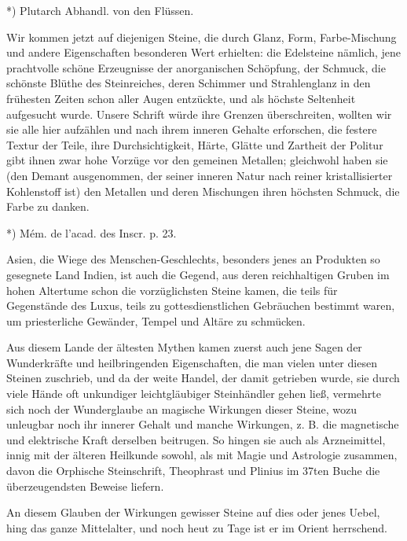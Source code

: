 \documentclass[a4paper, 11pt, oneside, polutonikogreek, german]{article}
\begin{document}
*) Plutarch Abhandl. von den Flüssen.

Wir kommen jetzt auf diejenigen Steine, die durch Glanz, Form, Farbe-Mischung und andere Eigenschaften besonderen Wert erhielten: die Edelsteine nämlich, jene prachtvolle schöne Erzeugnisse der anorganischen Schöpfung, der Schmuck, die schönste Blüthe des Steinreiches, deren Schimmer und Strahlenglanz in den frühesten Zeiten schon aller Augen entzückte, und als höchste Seltenheit aufgesucht wurde. Unsere Schrift würde ihre Grenzen überschreiten, wollten wir sie alle hier aufzählen und nach ihrem inneren Gehalte erforschen, die festere Textur der Teile, ihre Durchsichtigkeit, Härte, Glätte und Zartheit der Politur gibt ihnen zwar hohe Vorzüge vor den gemeinen Metallen; gleichwohl haben sie (den Demant ausgenommen, der seiner inneren Natur nach reiner kristallisierter Kohlenstoff ist) den Metallen und deren Mischungen ihren höchsten Schmuck, die Farbe zu danken.

*) Mém. de l'acad. des Inscr. p. 23.

Asien, die Wiege des Menschen-Geschlechts, besonders jenes an Produkten so gesegnete Land Indien, ist auch die Gegend, aus deren reichhaltigen Gruben im hohen Altertume schon die vorzüglichsten Steine kamen, die teils für Gegenstände des Luxus, teils zu gottesdienstlichen Gebräuchen bestimmt waren, um priesterliche Gewänder, Tempel und Altäre zu schmücken.

Aus diesem Lande der ältesten Mythen kamen zuerst auch jene Sagen der Wunderkräfte und heilbringenden Eigenschaften, die man vielen unter diesen Steinen zuschrieb, und da der weite Handel, der damit getrieben wurde, sie durch viele Hände oft unkundiger leichtgläubiger Steinhändler gehen ließ, vermehrte sich noch der Wunderglaube an magische Wirkungen dieser Steine, wozu unleugbar noch ihr innerer Gehalt und manche Wirkungen, z. B. die magnetische und elektrische Kraft derselben beitrugen. So hingen sie auch als Arzneimittel, innig mit der älteren Heilkunde sowohl, als mit Magie und Astrologie zusammen, davon die Orphische Steinschrift, Theophrast und Plinius im 37ten Buche die überzeugendsten Beweise liefern.

An diesem Glauben der Wirkungen gewisser Steine auf dies oder jenes Uebel, hing das ganze Mittelalter, und noch heut zu Tage ist er im Orient herrschend.
\end{document}
